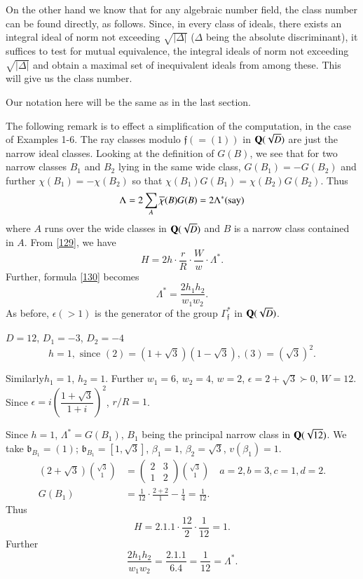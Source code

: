On the other hand we know that for any algebraic number field, the
class number can be found directly, as follows. Since, in every class
of ideals, there exists an integral ideal of norm not exceeding
$\sqrt{|\Delta|}$ ($\Delta$ being the absolute discriminant), it
suffices to test for mutual equivalence, the integral ideals of norm
not exceeding $\sqrt{|\Delta|}$ and obtain a maximal set of
inequivalent ideals from among these. This will give us the class
number.

Our notation here will be the same as in the last section.

The following remark is to effect a simplification of the computation,
in the case of Examples 1-6. The ray classes modulo
$\mathfrak{f}(=(1))$ in $\mathbf{Q}(\sqrt{D})$ are just the narrow ideal
classes. Looking at the definition of $G(B)$, we see that for two
narrow classes $B_{1}$ and $B_{2}$ lying in the same wide class,
$G(B_{1})=-G(B_{2})$ and further $\chi(B_{1})=-\chi(B_{2})$ so that
$\chi(B_{1})G(B_{1})=\chi(B_{2})G(B_{2})$. Thus
$$
\Lambda=2\sum_{A}\overline{\chi}(B)G(B)=2\Lambda^{\ast}(\text{say})
$$
where $A$ runs over the wide classes in $\mathbf{Q}(\sqrt{D})$ and $B$ is a
narrow class contained in $A$. From \eqref{129}, we have
$$
H=2h\cdot \frac{r}{R}\cdot \frac{W}{w}\cdot \Lambda^{\ast}.
$$
Further, formula \eqref{130} becomes
$$
\Lambda^{\ast}=\frac{2h_{1}h_{2}}{w_{1}w_{2}}.
$$
As before, $\epsilon(>1)$ is the generator of the group
$\Gamma^{\ast}_{\mathfrak{f}}$ in $\mathbf{Q}(\sqrt{D})$. 

\begin{exam}\label{exam1}
$D=12$, $D_{1}=-3$, $D_{2}=-4$
$$
h=1,\text{ \ since \ }
(2)=(1+\sqrt{3})(1-\sqrt{3}),(3)=(\sqrt{3})^{2}. 
$$
\end{exam}

Similarly\pageoriginale $h_{1}=1$, $h_{2}=1$. Further $w_{1}=6$,
$w_{2}=4$, $w=2$, $\epsilon=2+\sqrt{3} \succ 0$, $W=12$. Since
$\epsilon=i\left(\dfrac{1+\sqrt{3}}{1+i}\right)^{2}$, $r/R=1$.

Since $h=1$, $\Lambda^{\ast}=G(B_{1})$, $B_{1}$ being the principal
narrow class in $\mathbf{Q}(\sqrt{12})$. We take $\mathfrak{b}_{B_{1}}=(1)$;
$\mathfrak{b}_{B_{1}}=[1,\sqrt{3}]$, $\beta_{1}=1$,
$\beta_{2}=\sqrt{3}$, $v(\beta_{1})=1$. 
\begin{align*}
(2+\sqrt{3})\binom{\sqrt{3}}{1} &= 
\begin{pmatrix}
2 & 3\\
1 & 2
\end{pmatrix}
\binom{\sqrt{3}}{1}\quad a=2, b=3, c=1, d=2.\\
G(B_{1}) &= \frac{1}{12}\cdot \frac{2+2}{1}-\frac{1}{4}=\frac{1}{12}. 
\end{align*}
Thus
$$
H=2.1.1\cdot \frac{12}{2}\cdot \frac{1}{12}=1.
$$
Further
$$
\frac{2h_{1}h_{2}}{w_{1}w_{2}}=\frac{2.1.1}{6.4}=\frac{1}{12}=\Lambda^{\ast}.
$$

